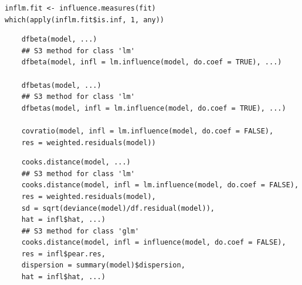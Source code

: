 \documentclass[residuals.tex]{subfiles}
\begin{document}
\begin{verbatim}
inflm.fit <- influence.measures(fit)
which(apply(inflm.fit$is.inf, 1, any))
\end{verbatim}
\newpage


\begin{framed}
	\begin{verbatim}
	dfbeta(model, ...)
	## S3 method for class 'lm'
	dfbeta(model, infl = lm.influence(model, do.coef = TRUE), ...)
	
	dfbetas(model, ...)
	## S3 method for class 'lm'
	dfbetas(model, infl = lm.influence(model, do.coef = TRUE), ...)
	
	covratio(model, infl = lm.influence(model, do.coef = FALSE),
	res = weighted.residuals(model))
	\end{verbatim}
\end{framed}

\begin{framed}
	\begin{verbatim}
	cooks.distance(model, ...)
	## S3 method for class 'lm'
	cooks.distance(model, infl = lm.influence(model, do.coef = FALSE),
	res = weighted.residuals(model),
	sd = sqrt(deviance(model)/df.residual(model)),
	hat = infl$hat, ...)
	## S3 method for class 'glm'
	cooks.distance(model, infl = influence(model, do.coef = FALSE),
	res = infl$pear.res,
	dispersion = summary(model)$dispersion,
	hat = infl$hat, ...)
	\end{verbatim}
\end{framed}
\end{document}
